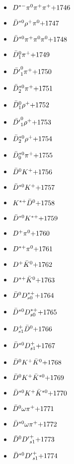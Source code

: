 \begin{multicols}{3}
\begin{itemize}
 \item $ D^{*-} \pi^{0} \pi^{+} \pi^{+} \hfill{+1746}$
 \item $ \bar{D}^{*0} \rho^{+} \pi^{0} \hfill{+1747}$
 \item $ \bar{D}^{*0} \pi^{+} \pi^{0} \pi^{0} \hfill{+1748}$
 \item $ \bar{D}_{1}^{0} \pi^{+} \hfill{+1749}$
 \item $ \bar{{D^{\prime}}}_{1}^{0} \pi^{+} \hfill{+1750}$
 \item $ \bar{D}_{2}^{*0} \pi^{+} \hfill{+1751}$
 \item $ \bar{D}_{1}^{0} \rho^{+} \hfill{+1752}$
 \item $ \bar{{D^{\prime}}}_{1}^{0} \rho^{+} \hfill{+1753}$
 \item $ \bar{D}_{2}^{*0} \rho^{+} \hfill{+1754}$
 \item $ \bar{D}_{0}^{*0} \pi^{+} \hfill{+1755}$
 \item $ \bar{D}^{0} K^{+} \hfill{+1756}$
 \item $ \bar{D}^{*0} K^{+} \hfill{+1757}$
 \item $ K^{*+} \bar{D}^{0} \hfill{+1758}$
 \item $ \bar{D}^{*0} K^{*+} \hfill{+1759}$
 \item $ D^{+} \pi^{0} \hfill{+1760}$
 \item $ D^{*+} \pi^{0} \hfill{+1761}$
 \item $ D^{+} \bar{K}^{0} \hfill{+1762}$
 \item $ D^{*+} \bar{K}^{0} \hfill{+1763}$
 \item $ \bar{D}^{0} D_{s0}^{*+} \hfill{+1764}$
 \item $ \bar{D}^{*0} D_{s0}^{*+} \hfill{+1765}$
 \item $ D_{s1}^{+} \bar{D}^{0} \hfill{+1766}$
 \item $ \bar{D}^{*0} D_{s1}^{+} \hfill{+1767}$
 \item $ \bar{D}^{0} K^{+} \bar{K}^{0} \hfill{+1768}$
 \item $ \bar{D}^{0} K^{+} \bar{K}^{*0} \hfill{+1769}$
 \item $ \bar{D}^{*0} K^{+} \bar{K}^{*0} \hfill{+1770}$
 \item $ \bar{D}^{0} \omega \pi^{+} \hfill{+1771}$
 \item $ \bar{D}^{*0} \omega \pi^{+} \hfill{+1772}$
 \item $ \bar{D}^{0} {D^{\prime}}_{s1}^{+} \hfill{+1773}$
 \item $ \bar{D}^{*0} {D^{\prime}}_{s1}^{+} \hfill{+1774}$

\end{itemize}
\end{multicols}
